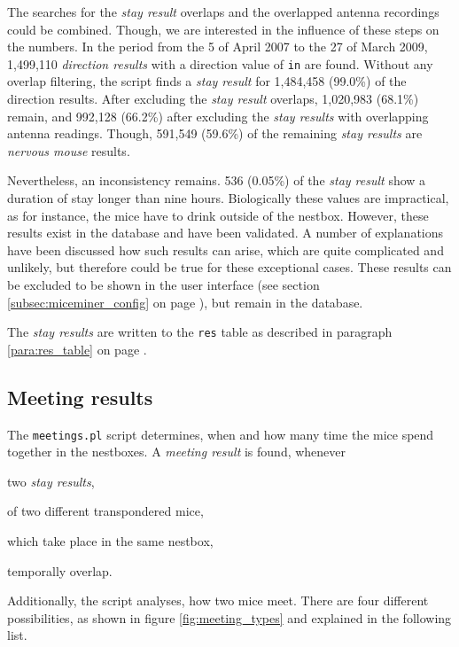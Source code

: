 The searches for the \textit{stay result} overlaps and the overlapped antenna recordings could be combined. Though, we are interested in the influence of these steps on the numbers. In the period from the 5 of April 2007 to the 27 of March 2009, 1,499,110 \textit{direction results} with a direction value of \lstinline|in| are found. Without any overlap filtering, the script finds a \textit{stay result} for 1,484,458 (99.0\%) of the direction results. After excluding the \textit{stay result} overlaps, 1,020,983 (68.1\%) remain, and 992,128 (66.2\%) after excluding the \textit{stay results} with overlapping antenna readings. Though, 591,549 (59.6\%) of the remaining \textit{stay results} are \textit{nervous mouse} results.

Nevertheless, an inconsistency remains. 536 (0.05\%) of the \textit{stay result} show a duration of stay longer than nine hours. Biologically these values are impractical, as for instance, the mice have to drink outside of the nestbox. However, these results exist in the database and have been validated. A number of explanations have been discussed how such results can arise, which are quite complicated and unlikely, but therefore could be true for these exceptional cases. These results can be excluded to be shown in the user interface (see section \ref{subsec:miceminer_config} on page \pageref{subsec:miceminer_config}), but remain in the database.     

The \textit{stay results} are written to the \lstinline|res| table as described in paragraph \ref{para:res_table} on page \pageref{para:res_table}.

\subsection{Meeting results}
\label{subsec:meetingres}

The \lstinline|meetings.pl| script determines, when and how many time the mice spend together in the nestboxes. A \textit{meeting result} is found, whenever

\begin{mylist}
\item two \textit{stay results},
\item of two different transpondered mice,
\item which take place in the same nestbox,
\item temporally overlap.
\end{mylist}

Additionally, the script analyses, how two mice meet. There are four different possibilities, as shown in figure \ref{fig:meeting_types} and explained in the following list.

